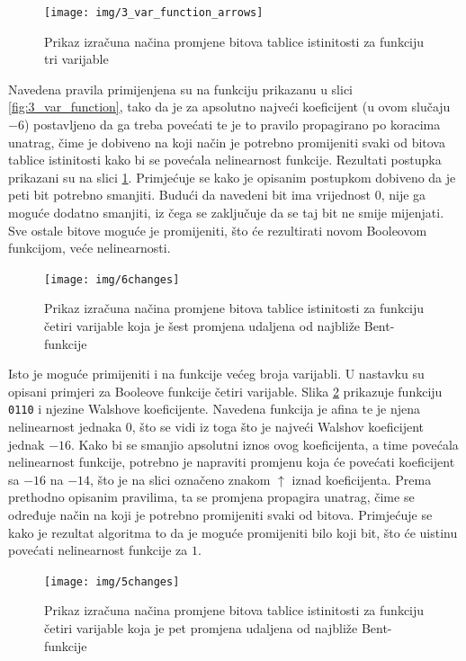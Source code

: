 \begin{figure}[ht!] 
    \centering
    \texttt{[image: img/3\_var\_function\_arrows]}
    \captionsetup{justification=centering}
    \caption{Prikaz izračuna načina promjene bitova tablice istinitosti za funkciju tri varijable}
    \label{fig:3_var_function_arrows}
\end{figure}
Navedena pravila primijenjena su na funkciju prikazanu u slici \ref{fig:3_var_function}, tako da je za apsolutno najveći koeficijent (u ovom slučaju $-6$) postavljeno da ga treba povećati te je to pravilo propagirano po koracima unatrag, čime je dobiveno na koji način je potrebno promijeniti svaki od bitova tablice istinitosti kako bi se povećala nelinearnost funkcije.
Rezultati postupka prikazani su na slici \ref{fig:3_var_function_arrows}. 
Primjećuje se kako je opisanim postupkom dobiveno da je peti bit potrebno smanjiti.
Budući da navedeni bit ima vrijednost $0$, nije ga moguće dodatno smanjiti, iz čega se zaključuje da se taj bit ne smije mijenjati.
Sve ostale bitove moguće je promijeniti, što će rezultirati novom Booleovom funkcijom, veće nelinearnosti.

\begin{figure}[ht!] 
    \centering
    \texttt{[image: img/6changes]}
    \captionsetup{justification=centering}
    \caption{Prikaz izračuna načina promjene bitova tablice istinitosti za funkciju četiri varijable koja je šest promjena udaljena od najbliže Bent-funkcije}
    \label{fig:6changes}
\end{figure}

Isto je moguće primijeniti i na funkcije većeg broja varijabli.
U nastavku su opisani primjeri za Booleove funkcije četiri varijable.
Slika \ref{fig:6changes} prikazuje funkciju \texttt{0110} i njezine Walshove koeficijente.
Navedena funkcija je afina te je njena nelinearnost jednaka $0$, što se vidi iz toga što je najveći Walshov koeficijent jednak $-16$.
Kako bi se smanjio apsolutni iznos ovog koeficijenta, a time povećala nelinearnost funkcije, potrebno je napraviti promjenu koja će povećati koeficijent sa $-16$ na $-14$, što je na slici označeno znakom $\uparrow$ iznad koeficijenta. 
Prema prethodno opisanim pravilima, ta se promjena propagira unatrag, čime se određuje način na koji je potrebno promijeniti svaki od bitova.
Primjećuje se kako je rezultat algoritma to da je moguće promijeniti bilo koji bit, što će uistinu povećati nelinearnost funkcije za $1$.

\begin{figure}[ht!] 
    \centering
    \texttt{[image: img/5changes]}
    \captionsetup{justification=centering}
    \caption{Prikaz izračuna načina promjene bitova tablice istinitosti za funkciju četiri varijable koja je pet promjena udaljena od najbliže Bent-funkcije}
    \label{fig:5changes}
\end{figure}

